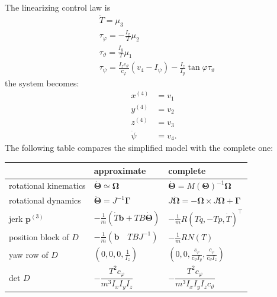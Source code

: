\documentclass[10pt, a4paper]{report}
\begin{document}
The linearizing control law is\begin{align}
    &\ddot T=\mu_3\\ 
    &\tau_\varphi=-\frac{I_x}{T}\mu_2\\
    &\tau_\vartheta=\frac{I_y}{T}\mu_1\\ 
    &\tau_\psi=\frac{I_zc_\vartheta}{c_\varphi}(v_4-I_\psi)-\frac{I_z}{I_y}\tan\varphi\tau_\vartheta
\end{align}
the system becomes:\begin{align}
        x^{(4)}&=v_1\\  y^{(4)}&=v_2\\  z^{(4)}&=v_3\\
        \ddot\psi &=v_4.
\end{align}
\noindent The following table compares the simplified model with the complete one:
\begin{table}[htbp]
    \centering
    \renewcommand{\arraystretch}{1.6} 
    \begin{tabular}{lll}
        \toprule
        & \textsf{\textbf{approximate}} & \textsf{\textbf{complete}} \\
        \midrule
        rotational kinematics & $\dot{\boldsymbol{\Theta}} \simeq \boldsymbol{\Omega}$ & $\dot{\boldsymbol{\Theta}} = M(\boldsymbol{\Theta})^{-1}\boldsymbol{\Omega}$ \\
        rotational dynamics   & $\ddot{\boldsymbol{\Theta}} = J^{-1}\boldsymbol{\Gamma}$ & $J\dot{\boldsymbol{\Omega}} = -\boldsymbol{\Omega} \times J\boldsymbol{\Omega} + \boldsymbol{\Gamma}$ \\
        jerk $\mathbf{p}^{(3)}$   & $-\frac{1}{m}(\dot{T}\mathbf{b} + TB\dot{\boldsymbol{\Theta}})$ & $-\frac{1}{m}R(Tq, -Tp, \dot{T})^\top$ \\
        position block of $D$ & $-\frac{1}{m}(\mathbf{b} \quad TBJ^{-1})$ & $-\frac{1}{m}RN(T)$ \\
        yaw row of $D$        & $(0, 0, 0, \frac{1}{I_z})$ & $\left(0, 0, \frac{s_\varphi}{c_\vartheta I_y}, \frac{c_\varphi}{c_\vartheta I_z}\right)$ \\
        det $D$               & $-\dfrac{T^2 c_\varphi}{m^3 I_x I_y I_z}$ & $-\dfrac{T^2 c_\varphi}{m^3 I_x I_y I_z c_\vartheta}$ \\
        \bottomrule
    \end{tabular}
\end{table}
\end{document}
